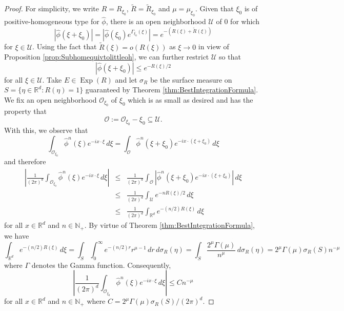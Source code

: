 \documentclass[11pt]{article}
\theoremstyle{remark}
\newcommand\Exp{\operatorname{Exp}}
\begin{document}
\begin{proof}
For simplicity, we write $R=R_{\xi_0}$, $\widetilde{R}=\widetilde{R}_{\xi_0}$ and $\mu=\mu_{\xi_0}$. Given that $\xi_0$ is of positive-homogeneous type for $\widehat{\phi}$, there is an open neighborhood $\mathcal{U}$ of $0$ for which
\begin{equation*}
    \left|\widehat{\phi}(\xi+\xi_0)\right|=\left|\widehat{\phi}(\xi_0)e^{\Gamma_{\xi_0}(\xi)}\right|=e^{-\left(R(\xi)+\widetilde{R}(\xi)\right)}
\end{equation*}
for $\xi\in \mathcal{U}$. Using the fact that $\widetilde{R}(\xi)=o(R(\xi))$ as $\xi\to 0$ in view of Proposition \ref{prop:Subhomequivtolittleoh}, we can further restrict $\mathcal{U}$ so that
\begin{equation*}
    \left|\widehat{\phi}(\xi+\xi_0)\right|\leq e^{-R(\xi)/2}
\end{equation*}
for all $\xi\in\mathcal{U}$. Take $E\in\Exp(R)$ and let $\sigma_R$ be the surface measure on  $S=\{\eta\in\mathbb{R}^d:R(\eta)=1\}$ guaranteed by Theorem \ref{thm:BestIntegrationFormula}. We fix an open neighborhood $\mathcal{O}_{\xi_0}$ of $\xi_0$ which is as small as desired and has the property that
\begin{equation*}
    \mathcal{O}:=\mathcal{O}_{\xi_0}-\xi_0\subseteq\mathcal{U}.
\end{equation*}
With this, we observe that
\begin{equation}\label{eq:WlogCenterAtZero}
\int_{\mathcal{O}_{\xi_0}}\widehat{\phi}^n(\xi)e^{-ix\cdot\xi}\,d\xi=\int_{\mathcal{O}}\widehat{\phi}^n(\xi+\xi_0)e^{-ix\cdot(\xi+\xi_0)}\,d\xi
\end{equation}
and therefore
\begin{eqnarray*}
    \left|\frac{1}{(2\pi)^d}\int_{\mathcal{O}_{\xi_0}}\widehat{\phi}^n(\xi)e^{-ix\cdot\xi}\,d\xi\right|&\leq& \frac{1}{(2\pi)^d}\int_{\mathcal{O}}\left|\widehat{\phi}^n(\xi+\xi_0)e^{-i x\cdot(\xi+\xi_0)}\right|\,d\xi\\
    &\leq& \frac{1}{(2\pi)^d}\int_{\mathcal{U}}e^{-nR(\xi)/2}\,d\xi\\
    &\leq&\frac{1}{(2\pi)^d}\int_{\mathbb{R}^d} e^{-(n/2)R(\xi)}\,d\xi
\end{eqnarray*}
for all $x\in\mathbb{R}^d$ and $n\in\mathbb{N}_+$. By virtue of Theorem \ref{thm:BestIntegrationFormula}, we have
\begin{equation*}
\int_{\mathbb{R}^d}e^{-(n/2)R(\xi)}\,d\xi=\int_S \int_0^\infty e^{-(n/2)r}r^{\mu-1}\,dr\,d\sigma_R(\eta)=\int_S \frac{2^\mu\Gamma(\mu)}{n^{\mu}}\,d\sigma_R(\eta)=2^\mu\Gamma(\mu)\sigma_R(S)n^{-\mu}
\end{equation*}
where $\Gamma$ denotes the Gamma function. Consequently,
\begin{equation*}
    \left|\frac{1}{(2\pi)^d}\int_{\mathcal{O}_{\xi_0}}\widehat{\phi}^n(\xi)e^{-ix\cdot\xi}\,d\xi\right|\leq C n^{-\mu}
\end{equation*}
for all $x\in\mathbb{R}^d$ and $n\in\mathbb{N}_+$ where $C=2^\mu \Gamma(\mu)\sigma_R(S)/(2\pi)^d.$
\end{proof}
\end{document}
